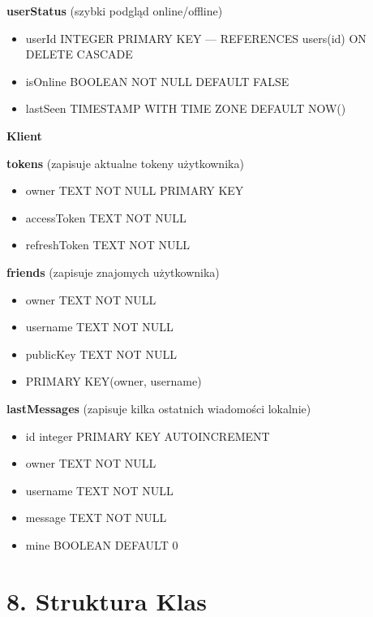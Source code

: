 \documentclass[a4paper,12pt]{article}
\begin{document}
\textbf{userStatus} (szybki podgląd online/offline)
\begin{itemize}
    \item userId INTEGER PRIMARY KEY — REFERENCES users(id) ON DELETE CASCADE
    \item isOnline BOOLEAN NOT NULL DEFAULT FALSE
    \item lastSeen TIMESTAMP WITH TIME ZONE DEFAULT NOW()
\end{itemize}

\textbf{Klient}

\textbf{tokens} (zapisuje aktualne tokeny użytkownika)
\begin{itemize}
    \item owner TEXT NOT NULL PRIMARY KEY
    \item accessToken TEXT NOT NULL
    \item refreshToken TEXT NOT NULL
\end{itemize}

\textbf{friends} (zapisuje znajomych użytkownika)
\begin{itemize}
    \item owner TEXT NOT NULL
    \item username TEXT NOT NULL
    \item publicKey TEXT NOT NULL
    \item PRIMARY KEY(owner, username)
\end{itemize}

\textbf{lastMessages} (zapisuje kilka ostatnich wiadomości lokalnie)
\begin{itemize}
    \item id integer PRIMARY KEY AUTOINCREMENT
    \item owner TEXT NOT NULL
    \item username TEXT NOT NULL
    \item message TEXT NOT NULL
    \item mine BOOLEAN DEFAULT 0
\end{itemize}



\section*{8. Struktura Klas}

\vspace{0.5 cm}
 \noindent
\vspace{0.5 cm}
 \noindent
\end{document}
